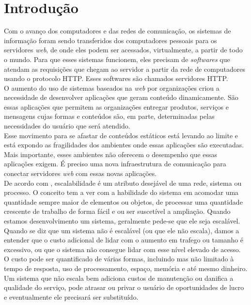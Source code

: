 \chapter{Introdução}\label{cap:introducao}
Com o avanço dos computadores e das redes de comunicação, os sistemas de 
informação foram sendo transferidos dos computadores pessoais para os 
servidores \textit{web}, de onde eles podem ser acessados, virtualmente, a 
partir de todo o mundo. Para que esses sistemas funcionem, eles precisam de 
\textit{softwares} que atendam as requisições que chegam ao servidor a partir 
da rede de computadores usando o protocolo HTTP. Esses softwares são chamados 
servidores HTTP.\\
O aumento do uso de sistemas baseados na \textit{web} por organizações criou a 
necessidade de desenvolver aplicações que geram conteúdo dinamicamente. São 
essas aplicações que permitem as organizações entregar produtos, serviços e 
mensagens cujas formas e conteúdos são, em parte, determinadas pelas 
necessidades do usuário que será atendido.\\
Esse movimento para se afastar de conteúdos estáticos está levando ao limite e 
está expondo as fragilidades dos ambientes onde essas aplicações são 
executadas. Mais importante, esses ambientes não oferecem o desempenho que 
essas aplicações exigem. É preciso uma nova infraestrutura de comunicação para 
conectar servidores \textit{web} com essas novas aplicações.\\
De acordo com , escalabilidade é um atributo desejável de 
uma rede, sistema ou processo. O conceito tem a ver com a habilidade do sistema 
em acomodar uma quantidade sempre maior de elementos ou objetos, de processar 
uma quantidade crescente de trabalho de forma fácil e ou ser suscetível a 
ampliação. Quando estamos desenvolvimento um sistema, geralmente pede-se que 
ele seja escalável.\\
Quando se diz que um sistema não é escalável (ou que ele não escala), damos a 
entender que o custo adicional de lidar com o aumento em trafego ou tamanho é 
excessivo, ou que o sistema não consegue lidar com esse nível elevado de 
acesso. O custo pode ser quantificado de várias formas, incluindo mas não 
limitado à tempo de resposta, uso de processamento, espaço, memória e até mesmo 
dinheiro. Um sistema que não escala bem adiciona custos de manutenção ou 
danifica a qualidade do serviço, pode atrasar ou privar o usuário de 
oportunidades de lucro e eventualmente ele precisará ser substituído.\\
